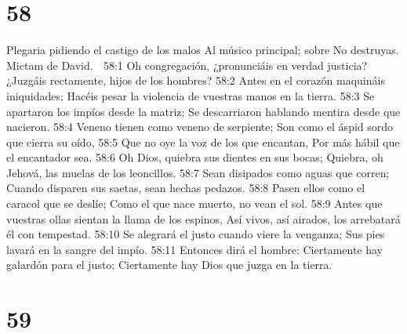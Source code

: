 \chapter{58}

Plegaria pidiendo el castigo de los malos 
Al músico principal; sobre No destruyas. Mictam de David. 

58:1 Oh congregación, ¿pronunciáis en verdad justicia? 
¿Juzgáis rectamente, hijos de los hombres? 
58:2 Antes en el corazón maquináis iniquidades; 
Hacéis pesar la violencia de vuestras manos en la tierra. 
58:3 Se apartaron los impíos desde la matriz; 
Se descarriaron hablando mentira desde que nacieron. 
58:4 Veneno tienen como veneno de serpiente; 
Son como el áspid sordo que cierra su oído, 
58:5 Que no oye la voz de los que encantan, 
Por más hábil que el encantador sea. 
58:6 Oh Dios, quiebra sus dientes en sus bocas; 
Quiebra, oh Jehová, las muelas de los leoncillos. 
58:7 Sean disipados como aguas que corren; 
Cuando disparen sus saetas, sean hechas pedazos. 
58:8 Pasen ellos como el caracol que se deslíe; 
Como el que nace muerto, no vean el sol. 
58:9 Antes que vuestras ollas sientan la llama de los espinos, 
Así vivos, así airados, los arrebatará él con tempestad. 
58:10 Se alegrará el justo cuando viere la venganza; 
Sus pies lavará en la sangre del impío. 
58:11 Entonces dirá el hombre: Ciertamente hay galardón para el justo; 
Ciertamente hay Dios que juzga en la tierra. 

\chapter{59}

